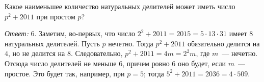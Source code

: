 \problem
Какое наименьшее количество натуральных делителей может иметь число
$p^2 + 2011$ при простом $p$?

\solution
\emph{Ответ:} $6$.
Заметим, во-первых, что число
$2^2 + 2011 = 2015 = 5 \cdot 13 \cdot 31$
имеет $8$ натуральных делителей.
Пусть $p$ нечетно.
Тогда $p^2 + 2011$ обязательно делится на $4$, но не делится на $8$.
Следовательно, $p^2 + 2011 = 4 m = 2^2 m$, где $m$~--- нечетно.
Отсюда число делителей не меньше $6$, причем ровно $6$ оно будет, если
$m$~--- простое.
Это будет так, например, при $p = 5$; тогда $5^2 + 2011 = 2036 = 4 \cdot 509$.

\endproblem
